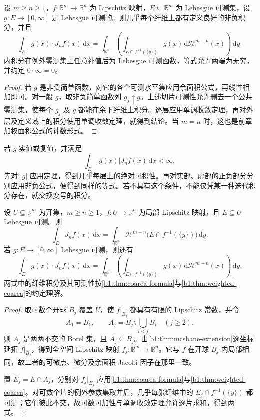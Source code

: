 \begin{theorem}[加权余面积公式]\label{b1:thm:weighted-coarea}
设 \(m\ge n\ge1\)，\(f:\mathbb R^m\to\mathbb R^n\) 为 Lipschitz 映射，\(E\subseteq\mathbb R^m\) 为 Lebesgue 可测集，设 \(g:E\rightarrow[0,\infty]\) 是 Lebesgue 可测的。则几乎每个纤维上都有定义良好的非负积分，并且
\[
 \int_Eg(x)\cdot J_nf(x)\,\mathrm dx
 =
 \int_{\mathbb R^n}
   \left(\int_{E\cap f^{-1}(\{y\})}g(x)\,
                     \mathrm d\mathcal H^{m-n}(x)\right)\,\mathrm dy.
\]
内积分在例外零测集上任意补值后为 Lebesgue 可测函数，等式允许两端为无穷，并约定 \(0\cdot\infty=0\)。
\end{theorem}
\begin{proof}
若 \(g\) 是非负简单函数，对它的各个可测水平集应用余面积公式，再线性相加即可。对一般 \(g\)，取非负简单函数列 \(g_j\uparrow g\)。上述切片可测性允许删去一个公共零测集，使每个 \(g_j\) 及 \(g\) 都能在余下纤维上积分。逐层应用单调收敛定理，再对外层及定义域上的积分使用单调收敛定理，就得到结论。当 \(m=n\) 时，这也是前章加权面积公式的计数形式。
\end{proof}

若 \(g\) 实值或复值，并满足
\[
 \int_E|g(x)|J_nf(x)\,\mathrm dx<\infty,
\]
先对 \(|g|\) 应用定理，得到几乎每层上的绝对可积性。再对实部、虚部的正负部分分别应用非负公式，便得到同样的等式。若不具有这个条件，不能仅凭某一种迭代积分存在，就交换变号的积分。

\begin{corollary}[局部余面积公式]\label{b1:cor:local-coarea-formulas}
设 \(U\subseteq\mathbb R^m\) 为开集，\(m\geq n\geq1\)，\(f:U\rightarrow\mathbb R^n\) 为局部 Lipschitz 映射，且 \(E\subseteq U\) Lebesgue 可测。则
\[
 \int_EJ_nf(x)\,\mathrm dx
 =
 \int_{\mathbb R^n}
 \mathcal H^{m-n}\bigl(E\cap f^{-1}(\{y\})\bigr)\,\mathrm dy.
\]
若 \(g:E\rightarrow[0,\infty]\) Lebesgue 可测，则还有
\[
 \int_Eg(x)\cdot J_nf(x)\,\mathrm dx
 =
 \int_{\mathbb R^n}
 \left(\int_{E\cap f^{-1}(\{y\})}g(x)\,
 \mathrm d\mathcal H^{m-n}(x)\right)\,\mathrm dy.
\]
两式中的纤维积分及其可测性按\cref{b1:thm:coarea-formula}与\cref{b1:thm:weighted-coarea}的约定理解。
\end{corollary}
\begin{proof}
取可数个开球 \(B_j\) 覆盖 \(U\)，使 \(f|_{B_j}\) 都具有有限的 Lipschitz 常数，并令
\[
 A_1=B_1,
 \qquad
 A_j=B_j\setminus\bigcup_{i<j}B_i\quad(j\geq2).
\]
则 \(A_j\) 是两两不交的 Borel 集，且 \(A_j\subseteq B_j\)。由\cref{b1:thm:mcshane-extension}逐坐标延拓 \(f|_{B_j}\)，得到全空间 Lipschitz 映射 \(f_j:\mathbb R^m\rightarrow\mathbb R^n\)。它与 \(f\) 在开球 \(B_j\) 内局部相同，故二者的可微点、微分及余面积 Jacobi 因子在那里一致。

置 \(E_j=E\cap A_j\)，分别对 \(f_j|_{E_j}\) 应用\cref{b1:thm:coarea-formula}与\cref{b1:thm:weighted-coarea}。对可数个片的例外参数集取并后，几乎每张纤维中的 \(E_j\cap f^{-1}(\{y\})\) 都可测；它们彼此不交，故可数可加性与单调收敛定理允许逐片求和，得到两式。
\end{proof}


